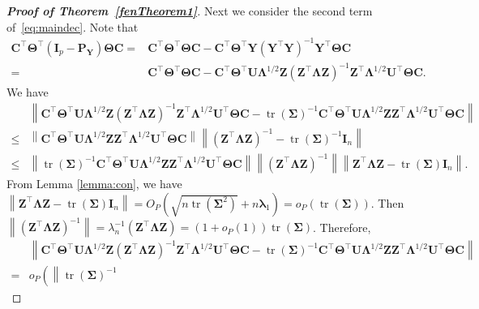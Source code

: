 \documentclass[12pt]{article} %
\DeclareMathOperator{\mytr}{tr}
\newcommand{\bZ}{\mathbf{Z}}
\newcommand{\bP}{\mathbf{P}}
\newcommand{\bY}{\mathbf{Y}}
\newcommand{\bC}{\mathbf{C}}
\newcommand{\bI}{\mathbf{I}}
\newcommand{\bU}{\mathbf{U}}
\newcommand{\bfsym}[1]{\ensuremath{\boldsymbol{#1}}}
\def\blambda {\bfsym {\lambda}}
\def\bLambda {\bfsym {\Lambda}}
\def\bSigma {\bfsym {\Sigma}}
\def\bTheta {\bfsym {\Theta}}
\theoremstyle{definition}
\begin{document}
\begin{appendices}
\begin{proof}[\textbf{Proof of Theorem~\ref{fenTheorem1}}]
Next we consider the second term of~\eqref{eq:maindec}.
Note that 
\begin{equation*}
    \begin{split}
    \bC^\top \bTheta^\top (\bI_p-\bP_\bY)\bTheta \bC=&
    \bC^\top \bTheta^\top\bTheta \bC-\bC^\top \bTheta^\top \bY (\bY^\top \bY)^{-1} \bY^\top \bTheta \bC
    \\
    =&
    \bC^\top \bTheta^\top\bTheta \bC-
    \bC^\top \bTheta^\top 
    \bU \bLambda^{1/2} \bZ (\bZ^\top \bLambda \bZ)^{-1}\bZ^\top \bLambda^{1/2}\bU^\top
    \bTheta \bC.
    \end{split}
\end{equation*}
We have
\begin{equation*}
    \begin{split}
    &\left\|
    \bC^\top \bTheta^\top 
    \bU \bLambda^{1/2} \bZ (\bZ^\top \bLambda \bZ)^{-1}\bZ^\top \bLambda^{1/2}\bU^\top
    \bTheta \bC
    -{\mytr(\bSigma)}^{-1}
\bC^\top \bTheta^\top
\bU \bLambda^{1/2} \bZ \bZ^\top \bLambda^{1/2}\bU^\top
    \bTheta \bC
    \right\|
    \\
    \leq&
    \left\|
\bC^\top \bTheta^\top
\bU \bLambda^{1/2} \bZ \bZ^\top \bLambda^{1/2}\bU^\top
    \bTheta \bC
    \right\|
    \left\|
   (\bZ^\top \bLambda \bZ)^{-1} -{\mytr(\bSigma)}^{-1}\bI_{n}
    \right\|
    \\
    \leq&
    \left\|
{\mytr(\bSigma)}^{-1}
\bC^\top \bTheta^\top
\bU \bLambda^{1/2} \bZ \bZ^\top \bLambda^{1/2}\bU^\top
    \bTheta \bC
    \right\|
    \left\|
(\bZ^\top \bLambda \bZ)^{-1}
    \right\|
    \left\|
   \bZ^\top \bLambda \bZ -\mytr(\bSigma)\bI_{n}
   \right\|.
    \end{split}
\end{equation*}
From Lemma \ref{lemma:con}, we have
$
    \left\|
   \bZ^\top \bLambda \bZ -\mytr(\bSigma)\bI_{n}
   \right\|=
   O_P(\sqrt{n\mytr(\bSigma^2)}+n\blambda_1)=o_P(\mytr(\bSigma))
   $.
   Then
   $
    \left\|
(\bZ^\top \bLambda \bZ)^{-1}
    \right\|
    =\lambda_n^{-1}
    (\bZ^\top \bLambda \bZ)=(1+o_P(1))\mytr(\bSigma)
    $.
    Therefore,
\begin{equation*}
    \begin{split}
    &\left\|
    \bC^\top \bTheta^\top 
    \bU \bLambda^{1/2} \bZ (\bZ^\top \bLambda \bZ)^{-1}\bZ^\top \bLambda^{1/2}\bU^\top
    \bTheta \bC
    -{\mytr(\bSigma)}^{-1}
\bC^\top \bTheta^\top
\bU \bLambda^{1/2} \bZ \bZ^\top \bLambda^{1/2}\bU^\top
    \bTheta \bC
    \right\|
    \\
    =&
    o_P\left(
    \left\|
{\mytr(\bSigma)}^{-1}

\end{split}
\end{equation*}
\end{proof}
\end{appendices}
\end{document}
